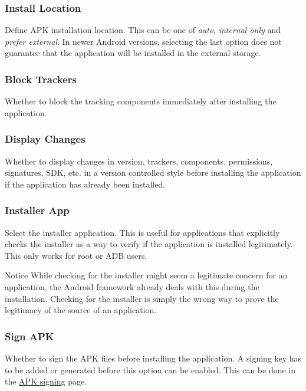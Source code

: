 \subsubsection{Install Location} %
Define APK installation location. This can be one of \textit{auto}, \textit{internal only} and \textit{prefer external}.
In newer Android versions, selecting the last option does not guarantee that the application will be installed in the
external storage.

\subsubsection{Block Trackers} %
Whether to block the tracking components immediately after installing the application.

\subsubsection{Display Changes} %
Whether to display changes in version, trackers, components, permissions, signatures, SDK, etc. in a version controlled
style before installing the application if the application has already been installed.

\subsubsection{Installer App} %
Select the installer application. This is useful for applications that explicitly checks the installer as a way to
verify if the application is installed legitimately. This only works for root or ADB users.

\begin{tip}{Notice}
    While checking for the installer might seem a legitimate concern for an application, the Android framework already
    deals with this during the installation. Checking for the installer is simply the wrong way to prove the legitimacy
    of the source of an application.
\end{tip}

\subsubsection{Sign APK} %
Whether to sign the APK files before installing the application. A signing key has to be added or generated before this
option can be enabled. This can be done in the \hyperref[subsec:apk-signing]{APK signing} page.

